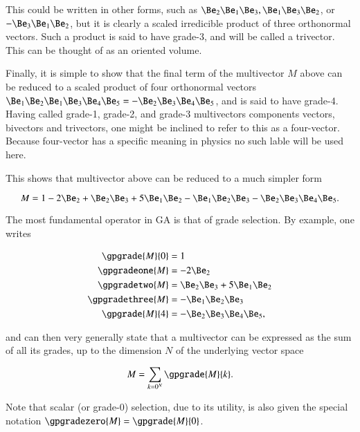 This could be written in other forms, such as \( \Be_2 \Be_1 \Be_3, \Be_1 \Be_3 \Be_2 \), or \( -\Be_3 \Be_1 \Be_2 \), but it is clearly a scaled irredicible product of three orthonormal vectors.  Such a product is said to have grade-3, and will be called a trivector.  This can be thought of as an oriented volume.

Finally, it is simple to show that the final term of the multivector \( M \) above can be reduced to a scaled product of four orthonormal vectors \( \Be_1 \Be_2 \Be_1 \Be_3 \Be_4 \Be_5 = -\Be_2 \Be_3 \Be_4 \Be_5 \), and is said to have grade-4.  Having called grade-1, grade-2, and grade-3 multivectors components vectors, bivectors and trivectors, one might be inclined to refer to this as a four-vector.  Because four-vector has a specific meaning in physics no such lable will be used here.

This shows that multivector above can be reduced to a much simpler form

\begin{dmath}\label{eqn:SimpleProducts:120}
M = 1 - 2 \Be_2  + \Be_2 \Be_3 + 5 \Be_1 \Be_2 - \Be_1 \Be_2 \Be_3 -\Be_2 \Be_3 \Be_4 \Be_5.
\end{dmath}

The most fundamental operator in GA is that of grade selection.  By example, one writes

\begin{dmath}\label{eqn:SimpleProducts:140}
\begin{aligned}
   \gpgrade{M}{0} &= 1 \\
   \gpgradeone{M} &= - 2 \Be_2 \\
   \gpgradetwo{M} &= \Be_2 \Be_3 + 5 \Be_1 \Be_2 \\
   \gpgradethree{M} &= - \Be_1 \Be_2 \Be_3 \\
   \gpgrade{M}{4} &= -\Be_2 \Be_3 \Be_4 \Be_5,
\end{aligned}
\end{dmath}

and can then very generally state that a multivector can be expressed as the sum of all its grades, up to the dimension \( N \) of the underlying vector space

\begin{dmath}\label{eqn:SimpleProducts:n}
   M = \sum_{k = 0^N} \gpgrade{M}{k}.
\end{dmath}

Note that scalar (or grade-0) selection, due to its utility, is also given the special notation \( \gpgradezero{M} = \gpgrade{M}{0} \).
